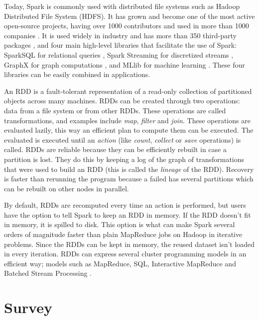 \documentclass{article}
\begin{document}
Today, Spark is commonly used with distributed file systems such as Hadoop Distributed File System (HDFS). It has grown and become one of the most active open-source projects, having over 1000 contributors and used in more than 1000 companies \cite{zaharia_apache_2016}. It is used widely in industry and has more than 350 third-party packages \cite{SparkPackages}, and four main high-level libraries that facilitate the use of Spark: SparkSQL for relational queries \cite{Armbrust}, Spark Streaming for discretized streams \cite{Zahariab}, GraphX for graph computations \cite{Gonzalez}, and MLlib for machine learning \cite{Meng2016}. These four libraries can be easily combined in applications.

An RDD is a fault-tolerant representation of a read-only collection of partitioned objects across many machines. RDDs can be created through two operations: data from a file system or from other RDDs. These operations are called transformations, and examples include \textit{map}, \textit{filter} and \textit{join}. These operations are evaluated lazily, this way an efficient plan to compute them can be executed. The evaluated is executed until an \textit{action} (like \textit{count}, \textit{collect} or \textit{save} operations) is called. RDDs are reliable because they can be efficiently rebuilt in case a partition is lost. They do this by keeping a log of the graph of transformations that were used to build an RDD (this is called the \textit{lineage} of the RDD). Recovery is faster than rerunning the program because a failed has several partitions which can be rebuilt on other nodes in parallel.

By default, RDDs are recomputed every time an action is performed, but users have the option to tell Spark to keep an RDD in memory. If the RDD doesn't fit in memory, it is spilled to disk. This option is what can make Spark several orders of magnitude faster than plain MapReduce jobs on Hadoop in iterative problems. Since the RDDs can be kept in memory, the reused dataset isn't loaded in every iteration. RDDs can express several cluster programming models in an efficient way; models such as MapReduce, SQL, Interactive MapReduce and Batched Stream Processing \cite{zaharia_resilient_2012}.


\section{Survey}
\end{document}
